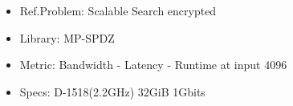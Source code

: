\begin{frame}
\begin{minipage}{.41\paperwidth}
\begin{figure}
\begin{tikzpicture}
            \end{tikzpicture}
            \begin{itemize}
                \item Ref.Problem: Scalable Search encrypted
                \item Library: MP-SPDZ
                \item Metric: Bandwidth - Latency - Runtime at input 4096
                \item Specs: D-1518(2.2GHz) 32GiB 1Gbits
            \end{itemize}
        \end{figure}
    \end{minipage}
\end{frame}